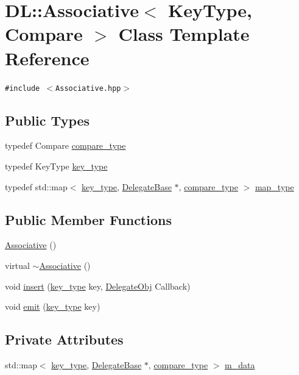 \hypertarget{classDL_1_1Associative}{
\section{DL::Associative$<$ Key\-Type, Compare $>$ Class Template Reference}
\label{classDL_1_1Associative}
}
{\tt \#include $<$Associative.hpp$>$}

\subsection*{Public Types}
\begin{CompactItemize}
\item 
typedef Compare \hyperlink{classDL_1_1Associative_w0}{compare\_\-type}
\item 
typedef Key\-Type \hyperlink{classDL_1_1Associative_w1}{key\_\-type}
\item 
typedef std::map$<$ \hyperlink{classDL_1_1Associative_w1}{key\_\-type}, \hyperlink{classDL_1_1DelegateBase}{Delegate\-Base} $\ast$, \hyperlink{classDL_1_1Associative_w0}{compare\_\-type} $>$ \hyperlink{classDL_1_1Associative_w2}{map\_\-type}
\end{CompactItemize}
\subsection*{Public Member Functions}
\begin{CompactItemize}
\item 
\hyperlink{classDL_1_1Associative_a0}{Associative} ()
\item 
virtual \hyperlink{classDL_1_1Associative_a1}{$\sim$Associative} ()
\item 
void \hyperlink{classDL_1_1Associative_a2}{insert} (\hyperlink{classDL_1_1Associative_w1}{key\_\-type} key, \hyperlink{namespaceDL_a0}{Delegate\-Obj} Callback)
\item 
void \hyperlink{classDL_1_1Associative_a3}{emit} (\hyperlink{classDL_1_1Associative_w1}{key\_\-type} key)
\end{CompactItemize}
\subsection*{Private Attributes}
\begin{CompactItemize}
\item 
std::map$<$ \hyperlink{classDL_1_1Associative_w1}{key\_\-type}, \hyperlink{classDL_1_1DelegateBase}{Delegate\-Base} $\ast$, \hyperlink{classDL_1_1Associative_w0}{compare\_\-type} $>$ \hyperlink{classDL_1_1Associative_r0}{m\_\-data}
\end{CompactItemize}
